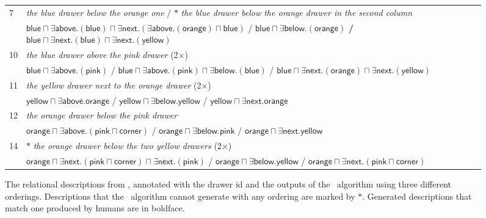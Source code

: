 \begin{figure*}[thb]
\begin{footnotesize}
\begin{tabular}{|l|p{}|}
\multirow{2}{*}{7} & \textit{the blue drawer below the orange one} / $\ast$ \textit{the blue drawer below the orange drawer in the second column}\\ 
& $\mathsf{blue} \sqcap \exists \mathsf{above}.(\mathsf{blue}) \sqcap \exists \mathsf{next}.(\exists \mathsf{above}.(\mathsf{orange}) \sqcap \mathsf{blue})$ / $\bm{\mathsf{blue} \sqcap \exists \mathsf{below}.(\mathsf{orange})}$ \textbf{/} $\mathsf{blue} \sqcap \exists \mathsf{next}.(\mathsf{blue}) \sqcap \exists \mathsf{next}.(\mathsf{yellow})$\\\hline
\multirow{2}{*}{10} & \textit{the blue drawer above the pink drawer} (2$\times$)\\
&  $\bm{\mathsf{blue} \sqcap \exists \mathsf{above}.(\mathsf{pink})}$  / $\mathsf{blue} \sqcap \exists \mathsf{above}.(\mathsf{pink}) \sqcap \exists \mathsf{below}.(\mathsf{blue})$  / $\mathsf{blue} \sqcap \exists \mathsf{next}.(\mathsf{orange}) \sqcap \exists \mathsf{next}.(\mathsf{yellow})$\\\hline
\multirow{2}{*}{11} & \textit{the yellow drawer next to the orange drawer} (2$\times$)\\
&  $\mathsf{yellow} \sqcap \exists \mathsf{above}.\mathsf{orange}$  / $\mathsf{yellow} \sqcap \exists \mathsf{below}.\mathsf{yellow}$  / $\bm{\mathsf{yellow} \sqcap \exists \mathsf{next}.\mathsf{orange}}$\\\hline
\multirow{2}{*}{12} & \textit{the orange drawer below the pink drawer}\\ 
&  $\mathsf{orange} \sqcap \exists \mathsf{above}.(\mathsf{pink} \sqcap \mathsf{corner})$  / $\bm{\mathsf{orange} \sqcap \exists \mathsf{below}.\mathsf{pink}}$  / $\mathsf{orange} \sqcap \exists \mathsf{next}.\mathsf{yellow}$\\\hline
\multirow{2}{*}{14} & $\ast$ \textit{the orange drawer below the two yellow drawers} (2$\times$)\\
&  $ \mathsf{orange} \sqcap \exists \mathsf{next}.(\mathsf{pink} \sqcap \mathsf{corner}) \sqcap \exists \mathsf{next}.(\mathsf{pink})$  / $\mathsf{orange} \sqcap \exists \mathsf{below}.\mathsf{yellow}$  / $\mathsf{orange} \sqcap \exists \mathsf{next}.(\mathsf{pink} \sqcap \mathsf{corner})$\\\hline
\end{tabular}
\end{footnotesize}

\caption{The relational descriptions from
  , annotated with
  the drawer id and the outputs of the \el\ algorithm using three
  different orderings.  Descriptions that the \el\ algorithm cannot
  generate with any ordering are marked by $\ast$. Generated
  descriptions that match one produced by humans are in boldface.}

\label{fig:example_outputs}
\end{figure*}


